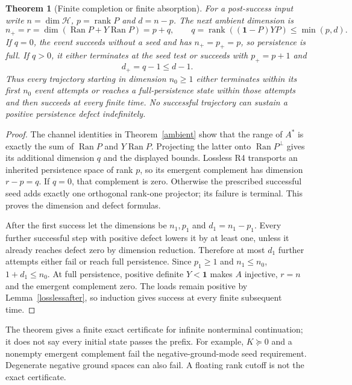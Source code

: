 \documentclass[11pt,letterpaper]{article}
\newcommand{\rank}{\operatorname{rank}}
\newcommand{\Ran}{\operatorname{Ran}}
\newcommand{\Id}{\mathbf 1}
\newtheorem{theorem}{Theorem}[section]
\theoremstyle{definition}
\numberwithin{equation}{section}
\begin{document}
\begin{theorem}[Finite completion or finite absorption]\label{finitecompletion}
For a post-success input write $n=\dim\mathcal H$, $p=\rank P$ and $d=n-p$. The next ambient dimension is
\begin{equation}
n_+=r=\dim(\Ran P+Y\Ran P)=p+q,\qquad
q=\rank((\Id-P)YP)\leq\min(p,d).
\end{equation}
If $q=0$, the event succeeds without a seed and has $n_+=p_+=p$, so persistence is full. If $q>0$, it either terminates at the seed test or succeeds with $p_+=p+1$ and
\begin{equation}
d_+=q-1\leq d-1.
\end{equation}
Thus every trajectory starting in dimension $n_0\geq1$ either terminates within its first $n_0$ event attempts or reaches a full-persistence state within those attempts and then succeeds at every finite time. No successful trajectory can sustain a positive persistence defect indefinitely.
\end{theorem}
\begin{proof}
The channel identities in Theorem~\ref{ambient} show that the range of $A^*$ is exactly the sum of $\Ran P$ and $Y\Ran P$. Projecting the latter onto $\Ran P^\perp$ gives its additional dimension $q$ and the displayed bounds. Lossless R4 transports an inherited persistence space of rank $p$, so its emergent complement has dimension $r-p=q$. If $q=0$, that complement is zero. Otherwise the prescribed successful seed adds exactly one orthogonal rank-one projector; its failure is terminal. This proves the dimension and defect formulas.

After the first success let the dimensions be $n_1,p_1$ and $d_1=n_1-p_1$. Every further successful step with positive defect lowers it by at least one, unless it already reaches defect zero by dimension reduction. Therefore at most $d_1$ further attempts either fail or reach full persistence. Since $p_1\geq1$ and $n_1\leq n_0$, $1+d_1\leq n_0$. At full persistence, positive definite $Y<\Id$ makes $A$ injective, $r=n$ and the emergent complement zero. The loads remain positive by Lemma~\ref{losslessafter}, so induction gives success at every finite subsequent time.
\end{proof}
The theorem gives a finite exact certificate for infinite nonterminal continuation; it does not say every initial state passes the prefix. For example, $K\succeq0$ and a nonempty emergent complement fail the negative-ground-mode seed requirement. Degenerate negative ground spaces can also fail. A floating rank cutoff is not the exact certificate.
\end{document}
